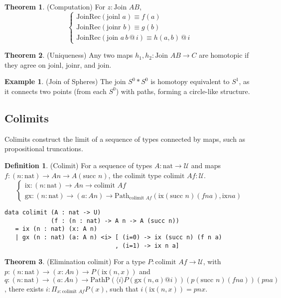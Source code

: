 \documentclass{article}
\theoremstyle{definition}
\newtheorem{theorem}{Theorem}
\newtheorem{definition}{Definition}
\newtheorem{example}{Example}
\begin{document}
\begin{theorem} (Computation)
For $z : \text{Join } A B$,
\[
\begin{cases}
\text{JoinRec}(\text{joinl } a) \equiv f(a) \\
\text{JoinRec}(\text{joinr } b) \equiv g(b) \\
\text{JoinRec}(\text{join } a \, b \, @ \, i) \equiv h(a, b) \, @ \, i
\end{cases}
\]
\end{theorem}

\begin{theorem} (Uniqueness)
Any two maps $h_1, h_2 : \text{Join } A B \to C$ are homotopic if they agree on $\text{joinl}$, $\text{joinr}$, and $\text{join}$.
\end{theorem}

\begin{example} (Join of Spheres)
The join $S^0 * S^0$ is homotopy equivalent to $S^1$, as it connects two points (from each $S^0$) with paths, forming a circle-like structure.
\end{example}


\newpage

\subsection{Colimits}
Colimits construct the limit of a sequence of types connected by maps, such as propositional truncations.

\begin{definition} (Colimit)
For a sequence of types $A : \text{nat} \to \mathcal{U}$ and maps $f : (n : \text{nat}) \to A n \to A (\text{succ } n)$, the colimit type $\text{colimit } A f : \mathcal{U}$.
\[
\begin{cases}
\text{ix} : (n : \text{nat}) \to A n \to \text{colimit } A f \\
\text{gx} : (n : \text{nat}) \to (a : A n) \to \text{Path}_{\text{colimit } A f} (\text{ix} (\text{succ } n) (f n a), \text{ix} n a)
\end{cases}
\]
\begin{lstlisting}
data colimit (A : nat -> U)
             (f : (n : nat) -> A n -> A (succ n))
   = ix (n : nat) (x: A n)
   | gx (n : nat) (a: A n) <i> [ (i=0) -> ix (succ n) (f n a)
                               , (i=1) -> ix n a]
\end{lstlisting}
\end{definition}

\begin{theorem} (Elimination $\text{colimit}$)
For a type $P : \text{colimit } A f \to \mathcal{U}$, with $p : (n : \text{nat}) \to (x : A n) \to P(\text{ix}(n, x))$ and $q : (n : \text{nat}) \to (a : A n) \to \text{PathP} (\langle i \rangle P(\text{gx}(n, a) @ i)) (p (\text{succ } n) (f n a)) (p n a)$, there exists $i : \Pi_{x:\text{colimit } A f} P(x)$, such that $i(\text{ix}(n, x)) = p n x$.
\end{theorem}
\end{document}
